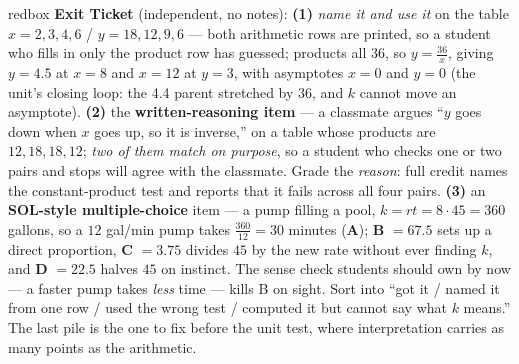 \documentclass[10pt]{article}
\begin{document}
\begin{skillbox}{redbox}
\textbf{Exit Ticket} (independent, no notes): \textbf{(1)} \emph{name it and use it} on the table
$x=2,3,4,6$ / $y=18,12,9,6$ --- both arithmetic rows are printed, so a student who fills in only the
product row has guessed; products all $36$, so $y=\frac{36}{x}$, giving $y=4.5$ at $x=8$ and $x=12$ at
$y=3$, with asymptotes $x=0$ and $y=0$ (the unit's closing loop: the 4.4 parent stretched by $36$, and
$k$ cannot move an asymptote). \textbf{(2)} the \textbf{written-reasoning item} --- a classmate argues
``$y$ goes down when $x$ goes up, so it is inverse,'' on a table whose products are $12,18,18,12$;
\emph{two of them match on purpose}, so a student who checks one or two pairs and stops will agree with
the classmate. Grade the \emph{reason}: full credit names the constant-product test and reports that it
fails across all four pairs. \textbf{(3)} an \textbf{SOL-style multiple-choice} item --- a pump filling
a pool, $k=rt=8\cdot45=360$ gallons, so a $12$ gal/min pump takes $\frac{360}{12}=30$ minutes
(\textbf{A}); \textbf{B} $=67.5$ sets up a direct proportion, \textbf{C} $=3.75$ divides $45$ by the new
rate without ever finding $k$, and \textbf{D} $=22.5$ halves $45$ on instinct. The sense check students
should own by now --- a faster pump takes \emph{less} time --- kills B on sight. Sort into ``got it /
named it from one row / used the wrong test / computed it but cannot say what $k$ means.'' The last pile
is the one to fix before the unit test, where interpretation carries as many points as the arithmetic.
\end{skillbox}
\end{document}
